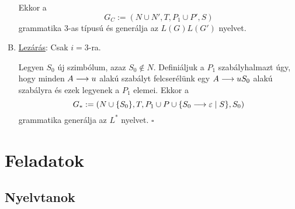 \begin{mdframed}
\begin{enumerate}[A)]
		Ekkor a \[ G_C := (N \cup N', T, P_1 \cup P', S) \] grammatika 3-as típusú
		és generálja az $L(G)L(G')$ nyelvet.
		\item \underline{Lezárás}: Csak $i=3$-ra.
		
		Legyen $S_0$ új szimbólum, azaz $S_0 \notin N$.
		Definiáljuk a $P_1$ szabályhalmazt úgy, hogy minden
		$A \longrightarrow u$ alakú szabályt felcserélünk egy $A \longrightarrow uS_0$ alakú
		szabályra és ezek legyenek a $P_1$ elemei. Ekkor a
		\[ G_{*} := (N \cup \{S_0\}, T, P_1 \cup P \cup \{ S_0 \longrightarrow \varepsilon \mid S \}, S_0) \]
		grammatika generálja az $L^*$ nyelvet. $\square$
	\end{enumerate}
\end{mdframed}

\iffalse

\section{Feladatok}

\subsection{Nyelvtanok}

